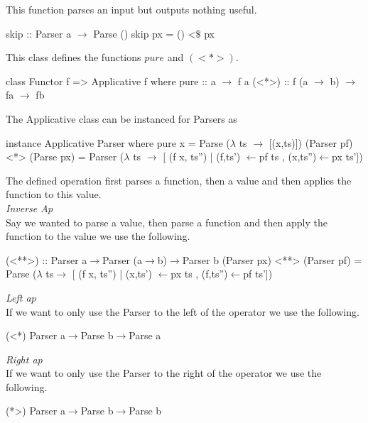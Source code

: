 \documentclass[11pt,a4paper]{article}
\begin{document}
This function parses an input but outputs nothing useful.
\begin{code}
skip :: Parser a $\to$ Parse ()
skip px = () <$\mathdollar$ px
\end{code}

This class defines the functions $pure$ and $(<*>)$.
\begin{code}
class Functor f => Applicative f where
  pure  :: a $\to$ f a
  (<*>) :: f (a $\to$ b) $\to$ fa $\to$ fb
\end{code}

The Applicative class can be instanced for Parsers as
\begin{code}
instance Applicative Parser
  where
    pure x = Parse ($\lambda$ ts $\to$ [(x,ts)])
    (Parser pf) <*> (Parse px) = Parser ($\lambda$ ts $\to$
                                        [ (f x, ts'')
                                        | (f,ts') $\leftarrow$pf ts
                                        , (x,ts'')$\leftarrow$px ts'])
\end{code}
The defined operation first parses a function, then a value and then applies the function to this value.\\

\textit{Inverse Ap}\\
Say we wanted to parse a value, then parse a function and then apply the function to the value we use the following.\\
\begin{code}
(<**>) :: Parser a$\to$Parser (a$\to$b)$\to$Parser b
(Parser px) <**> (Parser pf) = Parse ($\lambda$ ts$\to$
                                     [ (f x, ts'')
                                     | (x,ts') $\leftarrow$px ts
                                     , (f,ts'')$\leftarrow$pf ts'])
\end{code}
\textit{Left ap}\\
If we want to only use the Parser to the left of the operator we use the following.\\
\begin{code}
(<*) Parser a$\to$Parse b$\to$Parse a
\end{code}
\textit{Right ap}\\
If we want to only use the Parser to the right of the operator we use the following.\\
\begin{code}
(*>) Parser a$\to$Parse b$\to$Parse b
\end{code}
\end{document}
